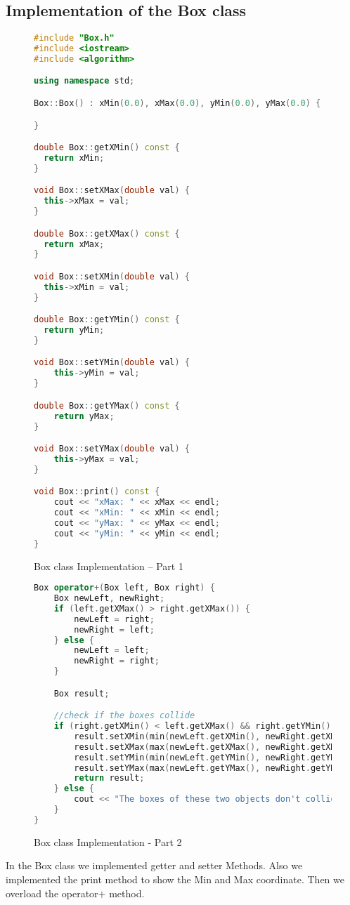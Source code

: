 \documentclass[a4paper, 10pt]{article}
\begin{document}
\subsection{Implementation of the Box class}
\begin{figure}[H]
\begin{lstlisting}[language=c++]
#include "Box.h"
#include <iostream>
#include <algorithm>

using namespace std;

Box::Box() : xMin(0.0), xMax(0.0), yMin(0.0), yMax(0.0) {

}

double Box::getXMin() const {
  return xMin;
}

void Box::setXMax(double val) {
  this->xMax = val;
}

double Box::getXMax() const {
  return xMax;
}

void Box::setXMin(double val) {
  this->xMin = val;
}

double Box::getYMin() const {
  return yMin;
}

void Box::setYMin(double val) {
	this->yMin = val;
}

double Box::getYMax() const {
	return yMax;
}

void Box::setYMax(double val) {
	this->yMax = val;
}

void Box::print() const {
	cout << "xMax: " << xMax << endl;
	cout << "xMin: " << xMin << endl;
	cout << "yMax: " << yMax << endl;
	cout << "yMin: " << yMin << endl;
}
\end{lstlisting}
\caption{Box class Implementation – Part 1}
\end{figure}

\begin{figure}[H]
\begin{lstlisting}[language=c++]
Box operator+(Box left, Box right) {
	Box newLeft, newRight;
	if (left.getXMax() > right.getXMax()) {
		newLeft = right;
		newRight = left;
	} else {
		newLeft = left;
		newRight = right;
	}

	Box result;

	//check if the boxes collide
	if (right.getXMin() < left.getXMax() && right.getYMin() < left.getYMax()) {
		result.setXMin(min(newLeft.getXMin(), newRight.getXMin()));
		result.setXMax(max(newLeft.getXMax(), newRight.getXMax()));
		result.setYMin(min(newLeft.getYMin(), newRight.getYMin()));
		result.setYMax(max(newLeft.getYMax(), newRight.getYMax()));
		return result;
	} else {
		cout << "The boxes of these two objects don't collide." << '\n';
	}
}
\end{lstlisting}
\caption{Box class Implementation - Part 2}
\end{figure}
In the Box class we implemented getter and setter Methods. Also we implemented the print method to show the Min and Max coordinate. Then we overload the  operator$+$ method.
\end{document}

